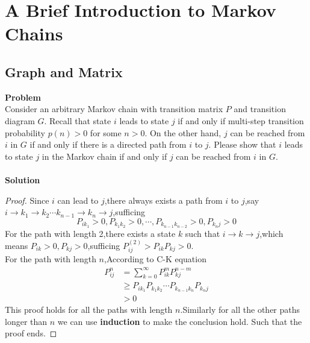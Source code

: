\chapter{A Brief Introduction to Markov Chains}
	
	\section{Graph and Matrix}
	\textbf{Problem}\\
	Consider an arbitrary Markov chain with transition matrix $P$ and transition diagram $G$. Recall that state $i$ leads to state $j$ if and only if multi-step transition probability $p(n) > 0$ for some $n > 0$. On the other hand, $j$ can be reached from $i$ in $G$ if and only if there is a directed path from $i$ to $j$. Please show that $i$ leads to state $j$ in the Markov chain if and only if $j$ can be reached from $i$ in $G$.\\\\
	\textbf{Solution}\\
	\begin{proof}
		Since $i$ can lead to $j$,there always exists a path from $i$ to $j$,say $i \rightarrow k_1 \rightarrow k_2 \cdots k_{n-1} \rightarrow k_n \rightarrow j$,sufficing 
	\[
		P_{ik_1} > 0, P_{k_1 k_2} > 0, \cdots ,P_{k_{n-1} k_{n-2}} > 0,P_{k_{n} j} > 0
	\]
	For the path with length 2,there exists a state $k$ such that $i \rightarrow k \rightarrow j$,which means $P_{ik} > 0,P_{kj} > 0$,sufficing $P^{(2)}_{ij} > P_{ik}P_{kj} > 0$.\\
	For the path with length $n$,According to C-K equation
	\begin{equation*}
		\begin{split}
			P^n_{ij} &= \sum_{k=0}^{\infty} P^{m}_{ik} P^{n-m}_{kj}\\
			&\geq P_{ik_1} P_{k_1 k_2} \cdots P_{k_{n-1} k_n} P_{k_n j}\\
			&> 0
		\end{split}
	\end{equation*}
	This proof holds for all the paths with length $n$.Similarly for all the other paths longer than $n$ we can use \textbf{induction} to make the conclusion hold.
	Such that the proof ends.
	\end{proof}
	
